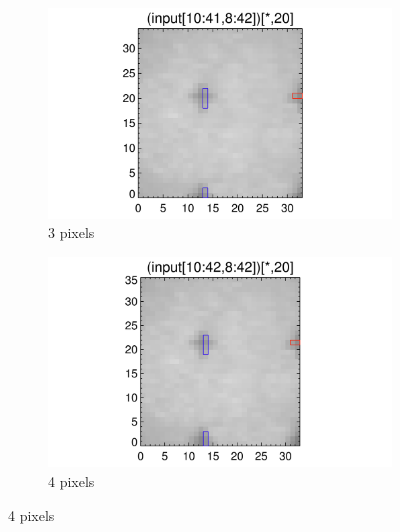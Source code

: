 \documentclass[10pt]{article}
\begin{document}
\begin{figure}[!h]
   \begin{subfigure}[b]{.45\linewidth}
        \centering
        \includegraphics[width=1.3\textwidth]{../plots_tables_images/moarfidcheck_withbothtruncate3.png}
        \caption{3 pixels}
    \end{subfigure}
    \begin{subfigure}[b]{.45\linewidth}
        \centering
        \includegraphics[width=1.3\textwidth]{../plots_tables_images/moarfidcheck_withbothtruncate4.png}
        \caption{4 pixels}
    \end{subfigure}


\end{figure}
\end{document}
